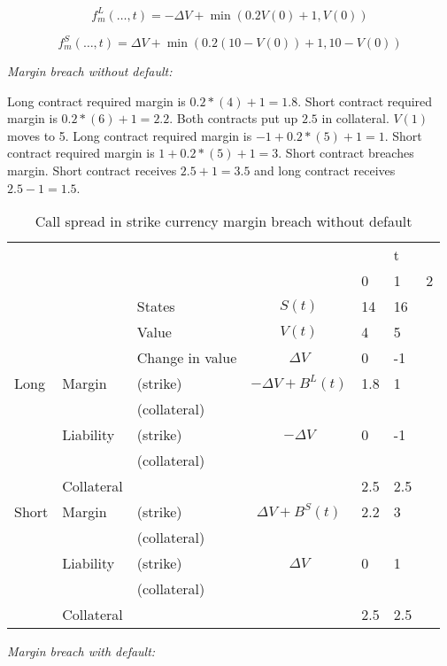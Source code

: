 \documentclass[12pt]{article}
\begin{document}
\[f_m^L(\ldots,t) = -\Delta V + \min(0.2 V(0) + 1, V(0))\]

\[f_m^S(\ldots,t) = \Delta V + \min(0.2 (10-V(0)) + 1, 10 - V(0))\]

\textit{Margin breach without default:}


Long contract required margin is $0.2 *(4) + 1 = 1.8$. Short contract required margin is $0.2 *(6)+ 1 = 2.2$. Both contracts put up $2.5$ in collateral.
$V(1)$ moves to 5. Long contract required margin is $-1+0.2*(5) +1 = 1$. Short contract required margin is $ 1 + 0.2*(5)+ 1 = 3$. Short contract breaches margin. Short contract receives $2.5 +1 = 3.5$ and long contract receives $2.5 - 1 = 1.5$.

\begin{table}
\begin{tabular}{lll|c|lll}
&  &  &  &  & t &\\  
&  &  &  & 0 & 1 & 2\\
\hline
\hline
&  & States &  $S(t)$ & 14 & 16 & \\
&  & Value  &  $V(t)$  & 4 & 5 &  \\
&  & Change in value & $\Delta V$ & 0& -1 &  \\
\hline
Long      & Margin    & (strike)     & $-\Delta V + B^L(t)$ & 1.8 & 1 &  \\
          &           & (collateral) & & & &\\ 
          & Liability & (strike)     & $-\Delta V$ & 0 & -1 & \\ 
          &           & (collateral)& & & &\\
          & Collateral&                       &    & 2.5 & 2.5 & \\          
\hline          
Short     & Margin    & (strike)     & $\Delta V + B^S(t)$  & 2.2 & 3 & \\
          &           & (collateral) & & & &\\
          & Liability & (strike)     & $\Delta V$ & 0 & 1 & \\
          &           & (collateral) & & & &\\
          & Collateral&                       &    & 2.5 & 2.5 & \\ 
          

\end{tabular}
\caption{Call spread in strike currency margin breach without default}
\label{fut}
\end{table}



\textit{Margin breach with default:}
\end{document}
